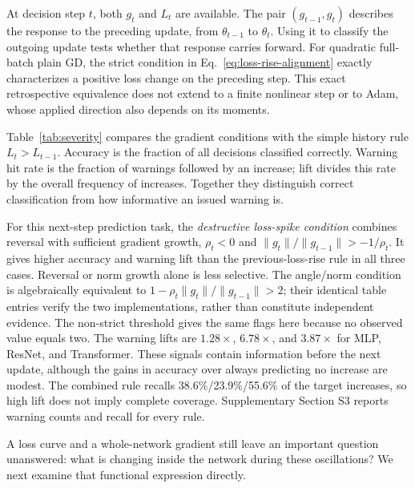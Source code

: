 At decision step $t$, both $g_t$ and $L_t$ are available. The pair
$(g_{t-1},g_t)$ describes the response to the preceding update, from
$\theta_{t-1}$ to $\theta_t$. Using it to classify the outgoing update
tests whether that response carries forward. For quadratic full-batch
plain GD, the strict condition in Eq.~\eqref{eq:loss-rise-alignment} exactly
characterizes a positive loss change on the preceding step. This exact
retrospective equivalence does not extend to a finite nonlinear step or
to Adam, whose applied direction also depends on its moments.

Table~\ref{tab:severity} compares the gradient conditions with the
simple history rule $L_t>L_{t-1}$. Accuracy is the fraction of all
decisions classified correctly. Warning hit rate is the fraction of
warnings followed by an increase; lift divides this rate by the overall
frequency of increases. Together they distinguish correct classification
from how informative an issued warning is.



For this next-step prediction task, the \emph{destructive loss-spike
condition} combines reversal with sufficient gradient growth, $\rho_t<0$ and
$\|g_t\|/\|g_{t-1}\|>-1/\rho_t$. It gives higher accuracy and warning
lift than the previous-loss-rise rule in all three cases. Reversal or
norm growth alone is less selective. The angle/norm condition is
algebraically equivalent to $1-\rho_t\|g_t\|/\|g_{t-1}\|>2$; their identical
table entries verify the two implementations, rather than constitute
independent evidence. The non-strict threshold gives the same flags
here because no observed value equals two. The warning lifts are
$1.28\times$, $6.78\times$, and $3.87\times$ for MLP, ResNet, and
Transformer. These signals contain information before the next update,
although the gains in accuracy over always predicting no increase are
modest. The combined rule recalls 38.6\%/23.9\%/55.6\% of the target
increases, so high lift does not imply complete coverage. Supplementary
Section S3 reports warning counts and recall for every rule.

A loss curve and a whole-network gradient still leave an important
question unanswered: what is changing inside the network during these
oscillations? We next examine that functional expression directly.

